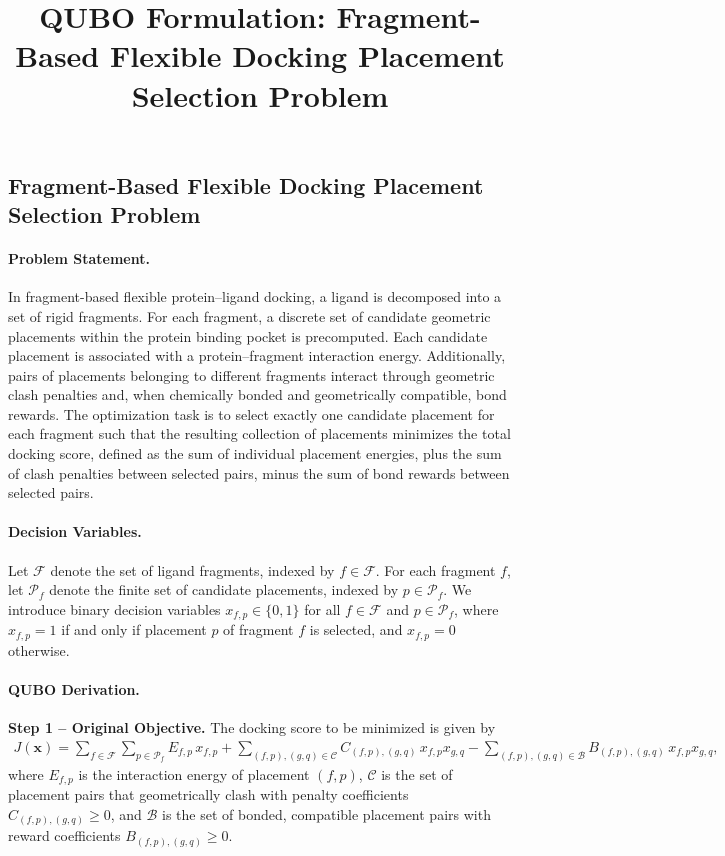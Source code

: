\documentclass[12pt]{article}
\title{QUBO Formulation: Fragment-Based Flexible Docking Placement Selection Problem}
\date{}
\begin{document}
\maketitle

\subsection*{Fragment-Based Flexible Docking Placement Selection Problem}

\paragraph{Problem Statement.}
In fragment-based flexible protein--ligand docking, a ligand is decomposed into a set of rigid fragments. For each fragment, a discrete set of candidate geometric placements within the protein binding pocket is precomputed. Each candidate placement is associated with a protein--fragment interaction energy. Additionally, pairs of placements belonging to different fragments interact through geometric clash penalties and, when chemically bonded and geometrically compatible, bond rewards. The optimization task is to select exactly one candidate placement for each fragment such that the resulting collection of placements minimizes the total docking score, defined as the sum of individual placement energies, plus the sum of clash penalties between selected pairs, minus the sum of bond rewards between selected pairs.

\paragraph{Decision Variables.}
Let $\mathcal{F}$ denote the set of ligand fragments, indexed by $f \in \mathcal{F}$. For each fragment $f$, let $\mathcal{P}_f$ denote the finite set of candidate placements, indexed by $p \in \mathcal{P}_f$. We introduce binary decision variables $x_{f,p} \in \{0,1\}$ for all $f \in \mathcal{F}$ and $p \in \mathcal{P}_f$, where $x_{f,p} = 1$ if and only if placement $p$ of fragment $f$ is selected, and $x_{f,p} = 0$ otherwise.

\paragraph{QUBO Derivation.}
\textbf{Step 1 -- Original Objective.}
The docking score to be minimized is given by
\begin{align}
J(\mathbf{x}) = \sum_{f \in \mathcal{F}} \sum_{p \in \mathcal{P}_f} E_{f,p} \, x_{f,p} 
+ \sum_{(f,p),(g,q) \in \mathcal{C}} C_{(f,p),(g,q)} \, x_{f,p} x_{g,q} 
- \sum_{(f,p),(g,q) \in \mathcal{B}} B_{(f,p),(g,q)} \, x_{f,p} x_{g,q},
\end{align}
where $E_{f,p}$ is the interaction energy of placement $(f,p)$, $\mathcal{C}$ is the set of placement pairs that geometrically clash with penalty coefficients $C_{(f,p),(g,q)} \geq 0$, and $\mathcal{B}$ is the set of bonded, compatible placement pairs with reward coefficients $B_{(f,p),(g,q)} \geq 0$.
\end{document}
